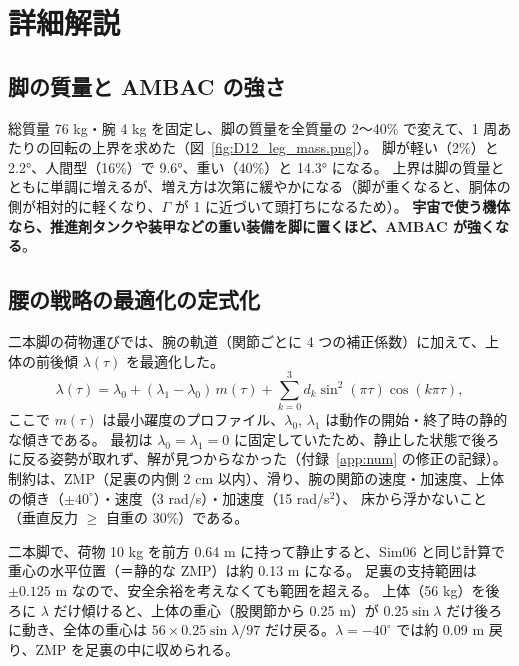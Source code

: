\section{詳細解説}

\subsection{脚の質量と AMBAC の強さ}

総質量 76 kg・腕 4 kg を固定し、脚の質量を全質量の 2〜40\% で変えて、1 周あたりの回転の上界を求めた（図~\ref{fig:D12_leg_mass.png}）。
脚が軽い（2\%）と 2.2°、人間型（16\%）で 9.6°、重い（40\%）と 14.3° になる。
上界は脚の質量とともに単調に増えるが、増え方は次第に緩やかになる（脚が重くなると、胴体の側が相対的に軽くなり、$\Gamma$ が 1 に近づいて頭打ちになるため）。
\textbf{宇宙で使う機体なら、推進剤タンクや装甲などの重い装備を脚に置くほど、AMBAC が強くなる}。


\subsection{腰の戦略の最適化の定式化}

二本脚の荷物運びでは、腕の軌道（関節ごとに 4 つの補正係数）に加えて、上体の前後傾 $\lambda(\tau)$ を最適化した。
\begin{equation}
\lambda(\tau) = \lambda_0 + (\lambda_1-\lambda_0)\,m(\tau) + \sum_{k=0}^{3} d_k\sin^2(\pi\tau)\cos(k\pi\tau),
\end{equation}
ここで $m(\tau)$ は最小躍度のプロファイル、$\lambda_0$, $\lambda_1$ は動作の開始・終了時の静的な傾きである。
最初は $\lambda_0=\lambda_1=0$ に固定していたため、静止した状態で後ろに反る姿勢が取れず、解が見つからなかった（付録~\ref{app:num} の修正の記録）。
制約は、ZMP（足裏の内側 2 cm 以内）、滑り、腕の関節の速度・加速度、上体の傾き（$\pm40^\circ$）・速度（3 rad/s）・加速度（15 rad/s$^2$）、
床から浮かないこと（垂直反力 $\ge$ 自重の 30\%）である。

\begin{example}[なぜ静止していても転倒するか]
二本脚で、荷物 10 kg を前方 0.64 m に持って静止すると、Sim06 と同じ計算で重心の水平位置（＝静的な ZMP）は約 0.13 m になる。
足裏の支持範囲は $\pm0.125$ m なので、安全余裕を考えなくても範囲を超える。
上体（56 kg）を後ろに $\lambda$ だけ傾けると、上体の重心（股関節から 0.25 m）が $0.25\sin\lambda$ だけ後ろに動き、全体の重心は
$56\times0.25\sin\lambda/97$ だけ戻る。$\lambda=-40^\circ$ では約 0.09 m 戻り、ZMP を足裏の中に収められる。
\end{example}

